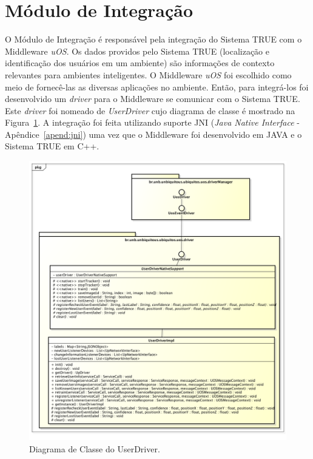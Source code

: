 \section{Módulo de Integração}
\label{sec:modulo-integracao}

	O Módulo de Integração é responsável pela integração do Sistema TRUE  com o
	Middleware \textit{uOS}. Os dados providos pelo Sistema TRUE (localização
	e identificação dos usuários em um ambiente) são informações de
	contexto relevantes para ambientes inteligentes. O Middleware \textit{uOS} foi
	escolhido como meio de fornecê-las as diversas aplicações no ambiente. Então,
	para integrá-los foi desenvolvido um \textit{driver} para o Middleware se comunicar
	com o Sistema TRUE. Este \textit{driver} foi nomeado de \textit{UserDriver} cujo diagrama de classe
	é mostrado na Figura~\ref{fig:userdriver}. A integração foi feita utilizando
	suporte JNI (\textit{Java Native Interface} - Apêndice~\ref{apend:jni}) uma vez que o Middleware foi desenvolvido em JAVA e o Sistema TRUE em C++.

	\begin{figure}[htb]
		\begin{center}
			\includegraphics[scale=0.45]{figuras/4.ProblemaEProposta/diagrama-classe-userdriver.png}
		\end{center}
		\caption{Diagrama de Classe do UserDriver.}
		\label{fig:userdriver}
	\end{figure}

